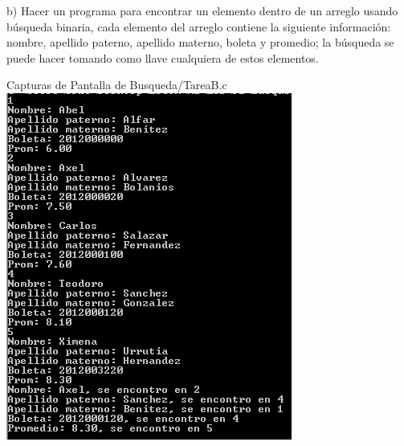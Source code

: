 b) Hacer un programa para encontrar un elemento dentro
de un arreglo usando búsqueda binaria, cada elemento del
arreglo contiene la siguiente información: nombre, apellido
paterno, apellido materno, boleta y promedio; la búsqueda se
puede hacer tomando como llave cualquiera de estos elementos.

Capturas de Pantalla de Busqueda/TareaB.c
\newline
\includegraphics{Busqueda/img/TareaB_1.png}
